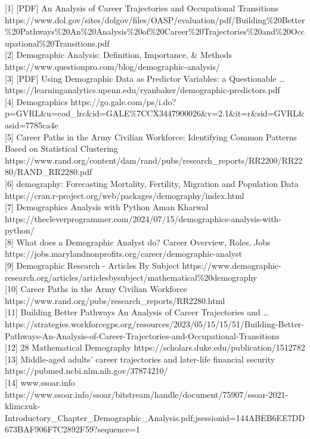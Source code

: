 \documentclass[
  letterpaper,
  DIV=11,
  numbers=noendperiod]{scrartcl}
\begin{document}
{[}1{]} {[}PDF{]} An Analysis of Career Trajectories and Occupational
Transitions
https://www.dol.gov/sites/dolgov/files/OASP/evaluation/pdf/Building\%20Better\%20Pathways\%20An\%20Analysis\%20of\%20Career\%20Trajectories\%20and\%20Occupational\%20Transitions.pdf\\
{[}2{]} Demographic Analysis: Definition, Importance, \& Methods
https://www.questionpro.com/blog/demographic-analysis/\\
{[}3{]} {[}PDF{]} Using Demographic Data as Predictor Variables: a
Questionable \ldots{}
https://learninganalytics.upenn.edu/ryanbaker/demographic-predictors.pdf\\
{[}4{]} Demographics
https://go.gale.com/ps/i.do?p=GVRL\&u=cod\_lrc\&id=GALE\%7CCX3447900026\&v=2.1\&it=r\&sid=GVRL\&asid=7785ca4e\\
{[}5{]} Career Paths in the Army Civilian Workforce: Identifying Common
Patterns Based on Statistical Clustering
https://www.rand.org/content/dam/rand/pubs/research\_reports/RR2200/RR2280/RAND\_RR2280.pdf\\
{[}6{]} demography: Forecasting Mortality, Fertility, Migration and
Population Data
https://cran.r-project.org/web/packages/demography/index.html\\
{[}7{]} Demographics Analysis with Python \textbar{} Aman Kharwal
https://thecleverprogrammer.com/2024/07/15/demographics-analysis-with-python/\\
{[}8{]} What does a Demographic Analyst do? Career Overview, Roles, Jobs
https://jobs.marylandnonprofits.org/career/demographic-analyst\\
{[}9{]} Demographic Research - Articles By Subject
https://www.demographic-research.org/articles/articlesbysubject/mathematical\%20demography\\
{[}10{]} Career Paths in the Army Civilian Workforce
https://www.rand.org/pubs/research\_reports/RR2280.html\\
{[}11{]} Building Better Pathways An Analysis of Career Trajectories and
\ldots{}
https://strategies.workforcegps.org/resources/2023/05/15/15/51/Building-Better-Pathways-An-Analysis-of-Career-Trajectories-and-Occupational-Transitions\\
{[}12{]} 28 Mathematical Demography
https://scholars.duke.edu/publication/1512782\\
{[}13{]} Middle-aged adults' career trajectories and later-life
financial security https://pubmed.ncbi.nlm.nih.gov/37874210/\\
{[}14{]} www.ssoar.info
https://www.ssoar.info/ssoar/bitstream/handle/document/75907/ssoar-2021-klimczuk-Introductory\_Chapter\_Demographic\_Analysis.pdf;jsessionid=144ABEB6EE7DD673BAF906F7C2892F59?sequence=1\\
\end{document}
